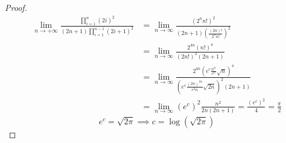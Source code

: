 \documentclass[12pt,a4paper]{report}
\numberwithin{equation}{section}
\theoremstyle{definition}
\theoremstyle{remark}
\begin{document}
\begin{proof}
\begin{align*}
\lim_{n\rightarrow +\infty} \frac{\displaystyle\prod_{i=1}^{n} (2i)^2}{(2n+1)\displaystyle \prod _{i=1}^{n-1} (2i+1)^2}  &= \lim_{n\rightarrow \infty} \frac{(2^n n!)^2}{(2n+1) \left( \frac{(2n)!}{2^n n!}\right)^2}\\
&=\lim_{n\rightarrow \infty} \frac{2^{4n} (n!)^4}{(2n!)^2 (2n+1)} \\
&=\lim_{n\rightarrow \infty} \frac{2^{4n} \left( e^c \frac{n^n}{e^n} \sqrt{n} \right)^4}{\left( e^c \frac{(2n)^{2n}}{e^2n} \sqrt{2n} \right)^2 (2n+1)}\\
&=\lim_{n\rightarrow \infty} (e^c)^2 \frac{n^2}{2n(2n+1)} = \frac{(e^c)^2}{4}
= \frac{\pi}{2} 
\end{align*}
\begin{equation}
e^c = \sqrt{2\pi} \implies c = \log(\sqrt{2\pi})
\end{equation}

\end{proof}

\tableofcontents
\end{document}
